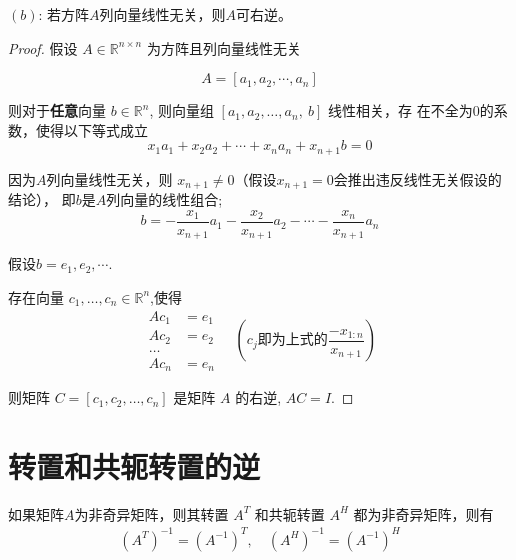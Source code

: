 \begin{theorem}
    $(b)$: 若方阵$A$列向量线性无关，则$A$可右逆。 
\end{theorem}

\begin{proof}
    假设 $ A \in \mathbb{R}^{n \times n} $ 为方阵且列向量线性无关 
    
    $$ A=\left[a_{1}, a_{2}, \cdots, a_{n}\right] $$

    则对于\textbf{任意}向量 $  {b} \in \mathbb{R}^{n} $, 则向量组 $ \left[a_{1}, a_{2}, \ldots, a_{n},  {~b}\right] $ 线性相关，存 在不全为0的系数，使得以下等式成立
    $$
    x_{1} a_{1}+x_{2} a_{2}+\cdots+x_{n} a_{n}+x_{n+1} b=0
    $$

    因为$A$列向量线性无关，则 $ x_{n+1} \neq 0 $（假设$ x_{n+1} = 0 $会推出违反线性无关假设的结论）， 即$b$是$A$列向量的线性组合;
    $$
    b=-\frac{x_{1}}{x_{n+1}} a_{1}-\frac{x_{2}}{x_{n+1}} a_{2}-\cdots-\frac{x_{n}}{x_{n+1}} a_{n}
    $$

    假设$b = e_1, e_2 , \cdots$.

    存在向量 $ c_{1}, \ldots, c_{n} \in \mathbb{R}^{n} $,使得 
    $$
    \begin{aligned}
        Ac _{1}&=e_{1}\\
         A c_{2}&=e_{2}\\
          \ldots \\
          A c_{n}&=e_{n}
    \end{aligned}
    \quad (c_j即为上式的 \frac{-x_{1:n}}{x_{n+1}})
    $$


    则矩阵 $ C=\left[c_{1}, c_{2}, \ldots,c_{n}\right] $ 是矩阵 $ A $ 的右逆, $ A C=I $.

\end{proof}

\section{转置和共轭转置的逆}

\begin{theorem}[转置 $ A^{T} $ 和共轭转置 $ A^{ {H}} $ ]
    如果矩阵$A$为非奇异矩阵，则其转置 $ A^{T} $ 和共轭转置 $ A^{ {H}} $ 都为非奇异矩阵，则有
$$
\begin{array}{l}
\left(A^{T}\right)^{-1}=\left(A^{-1}\right)^{T}, \quad\left(A^{H}\right)^{-1}=\left(A^{-1}\right)^{H} \\
\end{array}
$$
\end{theorem}

